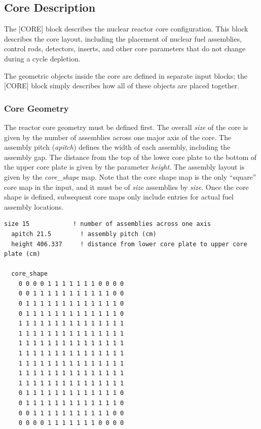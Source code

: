 %
%
\subsection{Core Description}

The [CORE] block describes the nuclear reactor core configuration.  This block describes the core layout, including
the placement of nuclear fuel assemblies, control rods, detectors, inserts, and other core parameters
that do not change during a cycle depletion.

The geometric objects inside the core are defined in separate input blocks; the [CORE] block
simply describes how all of these objects are placed together.

\subsubsection{Core Geometry}

The reactor core geometry must be defined first. The overall {\it size} of the core is
given by the number of assemblies across one major axis of the core.  The assembly pitch ({\it apitch}) defines the
width of each assembly, including the assembly gap. The distance from the top of the lower core plate to the
bottom of the upper core plate is given by the parameter {\it height}.
The assembly layout is given by the {\it core\_shape} map.
Note that the core shape map is the only ``square'' core map in the input, and it must be of {\it size} assemblies by {\it size}.
Once the core shape is defined, subsequent core maps only include entries for actual fuel assembly locations.

\begin{Verbatim}[fontsize=\small]
  size 15            ! number of assemblies across one axis
  apitch 21.5        ! assembly pitch (cm)
  height 406.337     ! distance from lower core plate to upper core plate (cm)

  core_shape
    0 0 0 0 1 1 1 1 1 1 1 0 0 0 0
    0 0 1 1 1 1 1 1 1 1 1 1 1 0 0
    0 1 1 1 1 1 1 1 1 1 1 1 1 1 0
    0 1 1 1 1 1 1 1 1 1 1 1 1 1 0
    1 1 1 1 1 1 1 1 1 1 1 1 1 1 1
    1 1 1 1 1 1 1 1 1 1 1 1 1 1 1
    1 1 1 1 1 1 1 1 1 1 1 1 1 1 1
    1 1 1 1 1 1 1 1 1 1 1 1 1 1 1
    1 1 1 1 1 1 1 1 1 1 1 1 1 1 1
    1 1 1 1 1 1 1 1 1 1 1 1 1 1 1
    1 1 1 1 1 1 1 1 1 1 1 1 1 1 1
    0 1 1 1 1 1 1 1 1 1 1 1 1 1 0
    0 1 1 1 1 1 1 1 1 1 1 1 1 1 0
    0 0 1 1 1 1 1 1 1 1 1 1 1 0 0
    0 0 0 0 1 1 1 1 1 1 1 0 0 0 0
\end{Verbatim}

